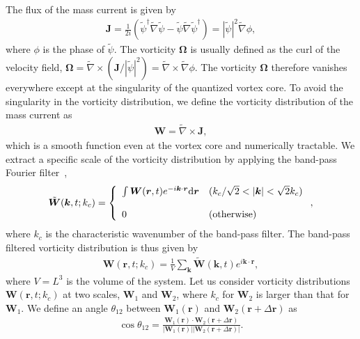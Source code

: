 \documentclass[aps,onecolumn,pra,longbibliography]{revtex4}
\begin{document}
	The flux of the mass current is given by
	\begin{eqnarray}
		\label{eq:CURRENT}
		{\bm J} = \frac{1}{2 i}
		\left(
			\tilde{\psi}^\dagger \tilde{\nabla} \tilde{\psi} - \tilde{\psi} \tilde{\nabla} \tilde{\psi}^\dagger
		\right) = |\tilde{\psi}|^2 \tilde{\nabla} \phi,
	\end{eqnarray}
	where $\phi$ is the phase of $\tilde{\psi}$.
	The vorticity $\bm{\Omega}$ is usually defined as the curl
	of the velocity field,
	$\bm{\Omega} = \tilde{\nabla} \times (\bm{J} / |\tilde{\psi}|^2) = \tilde{\nabla} \times \tilde{\nabla} \phi$.
	The vorticity $\bm{\Omega}$ therefore vanishes everywhere
	except at the singularity of the quantized vortex core.
	To avoid the singularity in the vorticity distribution,
	we define the vorticity distribution of the mass current as
	\begin{eqnarray}
		\label{eq:VORTICITY}
		{\bm W} = \tilde{\nabla} \times {\bm J},
	\end{eqnarray}
	which is a smooth function even at the vortex core and
	numerically tractable.
	We extract a specific scale of the vorticity distribution by applying
	the band-pass Fourier filter~\cite{S.Goto2, S.Goto3},
	\begin{eqnarray}
		\label{eq:FFT}
		\tilde{{\bm W}}(\bm{k}, t; k_c) = \left\{
			\begin{array}{ll}
				\int {\bm W}({\bm r}, t) e^{-i \bm{k} \cdot {\bm r}}  {\rm d}\bm{r}
				& (k_c/\sqrt{2}< |\bm{k}| <\sqrt{2}k_c)
				\\
				\\
				0 & ({\rm otherwise})
			\end{array}
		\right.,
	\end{eqnarray}
	where $k_c$ is the characteristic wavenumber of the band-pass filter.
	The band-pass filtered vorticity distribution is thus given by
	\begin{eqnarray}
		\label{eq:IFFT}
		{\bm W}(\bm{r}, t; k_c) =
		\frac{1}{V} \sum_{\bm{k}} \tilde{\bm{W}}(\bm{k}, t) e^{i \bm{k} \cdot \bm{r}},
	\end{eqnarray}
	where $V=L^3$ is the volume of the system.
	Let us consider vorticity distributions $\bm{W}(\bm{r}, t; k_c)$ at two scales,
	$\bm{W}_1$ and $\bm{W}_2$,
	where $k_c$ for $\bm{W}_2$ is larger than that for $\bm{W}_1$.
	We define an angle $\theta_{12}$ between
	$\bm{W}_1(\bm{r})$ and $\bm{W}_2(\bm{r}+\Delta\bm{r})$ as
	\begin{eqnarray}
		\label{eq:ORTH}
		\cos \theta_{12}
		= \frac{{\bm W}_1({\bm r}) \cdot {\bm W}_2({\bm r} + \Delta {\bm r}) }
		{
			|{\bm W}_1({\bm r})| |{\bm W}_2({\bm r} + \Delta {\bm r})|
		}.
	\end{eqnarray}
\end{document}
